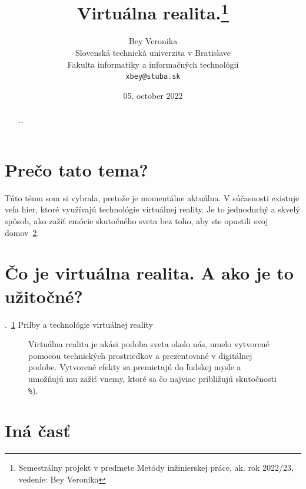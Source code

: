 \documentclass[10pt,twoside,slovak,a4paper]{article}
\title{Virtuálna realita.\thanks{Semestrálny projekt v predmete Metódy inžinierskej práce, ak. rok 2022/23, vedenie: Bey Veronika}} %
\author{Bey Veronika\\[2pt]
	{\small Slovenská technická univerzita v Bratislave}\\
	{\small Fakulta informatiky a informačných technológií}\\
	{\small \texttt{xbey@stuba.sk}}
	}
\date{\small 05. october 2022} %
\begin{document}
\maketitle

\begin{abstract}
\ldots
\end{abstract}



\section{Prečo tato tema?}


Túto tému som si vybrala, pretože je momentálne aktuálna. V súčasnosti existuje veľa hier, ktoré využívajú technológie virtuálnej reality. Je to jednoduchý a skvelý spôsob, ako zažiť emócie skutočného sveta bez toho, aby ste opustili svoj domov~\ref{nejaka}.



\section{Čo je virtuálna realita. A ako je to užitočné?} \label{nejaka}
.~\ref{f:rozhod} Prilby a technológie virtuálnej reality
\begin{figure}[tbh]
\centering
Virtuálna realita je akási podoba sveta okolo nás, umelo vytvorené pomocou technických prostriedkov a prezentované v digitálnej podobe. Vytvorené efekty sa premietajú do ľudskej mysle a umožňujú mu zažiť vnemy, ktoré sa čo najviac približujú skutočnosti \texttt{\%}).
\label{f:rozhod}
\end{figure}



\section{Iná časť} \label{ina}
\end{document}
